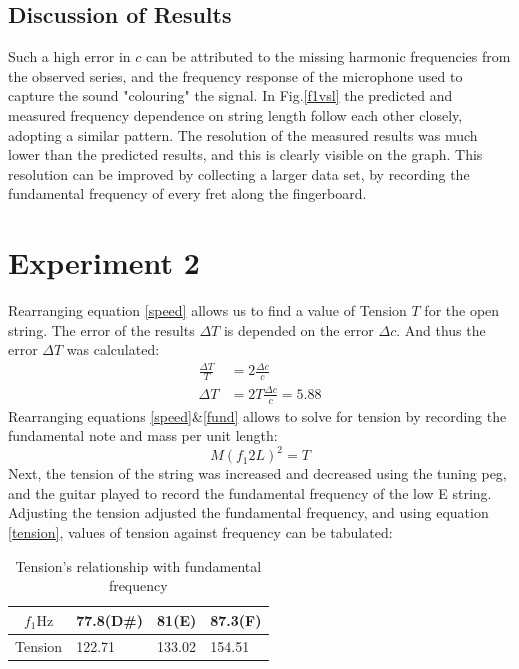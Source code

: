 \documentclass[11pt]{article}
\begin{document}
        \subsection{Discussion of Results}
            Such a high error in $c$ can be attributed to the missing harmonic frequencies from the observed series, and the frequency response of the microphone used to capture the sound "colouring" the signal.
            In Fig.\ref{f1vsl} the predicted and measured frequency dependence on string length follow each other closely, adopting a similar pattern.
            The resolution of the measured results was much lower than the predicted results, and this is clearly visible on the graph.
            This resolution can be improved by collecting a larger data set, by recording the fundamental frequency of every fret along the fingerboard.
            
    \section{Experiment 2}
        Rearranging equation \ref{speed} allows us to find a value of Tension $T$ for the open string.
        The error of the results $\Delta T$ is depended on the error $\Delta c$. And thus the error $\Delta T$ was calculated:
        \begin{align}
            \frac{\Delta T}{T} & = 2 \frac{\Delta c}{c}\\
            \Delta T & = 2 T \frac{\Delta c}{c} = 5.88
        \end{align}
        Rearranging equations \ref{speed}\&\ref{fund} allows to solve for tension by recording the fundamental note and mass per unit length:
        \begin{equation}\label{tension}
            M(f_1 2L)^2 =  T
        \end{equation}
        Next, the tension of the string was increased and decreased using the tuning peg, and the guitar played to record the fundamental frequency of the low E string.
        Adjusting the tension adjusted the fundamental frequency, and using equation \ref{tension}, values of tension against frequency can be tabulated:
        \begin{table}[H]
            \centering
            \begin{tabular}{c | l l l}
                \hline
                $f_1\si{\hertz}$ & 77.8(D\#) & 81(E) & 87.3(F) \\
                \hline
                Tension & 122.71 & 133.02 & 154.51 \\
                \hline
            \end{tabular}
            \caption{Tension's relationship with fundamental frequency}
        \end{table}
        
\end{document}
